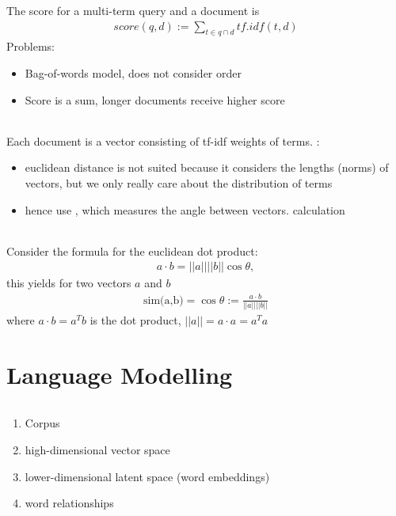 \documentclass[10pt,twocolumn]{article}
\begin{document}
The score for a multi-term query and a document is
\begin{align*}
  \mathit{score}(q,d) := \sum_{t \in q \cap d} \mathit{tf.idf}(t,d)
\end{align*}
Problems:
\begin{itemize}
\item Bag-of-words model, does not consider order
\item Score is a sum, longer documents receive higher score
\end{itemize}

\paragraph{} Each document is a vector consisting of
tf-idf weights of terms. :
\begin{itemize}
\item euclidean distance is not suited because it considers the lengths (norms)
  of vectors, but we only really care about the distribution of terms
\item hence use , which measures the angle between
  vectors. \todo calculation
\end{itemize}

\paragraph{} Consider the formula for the euclidean dot
product:
\begin{align*}
  a \cdot b = ||a|| ||b|| \cos \theta,
\end{align*} this yields for two vectors $a$ and $b$
\begin{align*}
  \text{sim(a,b)} = \cos \theta := \frac{a \cdot b}{||a|| ||b||} 
\end{align*}
where $a \cdot b = a^Tb$ is the dot product, $||a|| = a \cdot a = a^Ta$



\pagebreak
\part{Language Modelling}

\paragraph{}
\begin{enumerate}
\item Corpus
\item high-dimensional vector space
\item lower-dimensional latent space (word embeddings)
\item word relationships
\end{enumerate}
\end{document}
